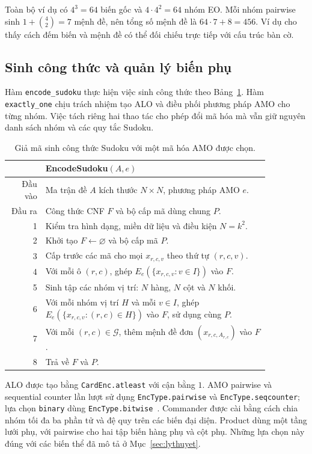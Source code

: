 \documentclass[a4paper,fleqn]{cas-sc}
\begin{document}
Toàn bộ ví dụ có $4^3=64$ biến gốc và $4\cdot4^2=64$ nhóm EO.
Mỗi nhóm pairwise sinh $1+\binom{4}{2}=7$ mệnh đề, nên tổng số mệnh đề
là $64\cdot7+8=456$. Ví dụ cho thấy cách đếm biến và mệnh đề có thể
đối chiếu trực tiếp với cấu trúc bàn cờ.

\subsection{Sinh công thức và quản lý biến phụ}

Hàm \texttt{encode\_sudoku} thực hiện việc sinh công thức theo
Bảng~\ref{tab:method-encoding-algorithm}. Hàm \texttt{exactly\_one}
chịu trách nhiệm tạo ALO và điều phối phương pháp AMO cho từng nhóm.
Việc tách riêng hai thao tác cho phép đổi mã hóa mà vẫn giữ nguyên
danh sách nhóm và các quy tắc Sudoku.

\begin{table}[pos=htbp]
 \centering
 \caption{Giả mã sinh công thức Sudoku với một mã hóa AMO được chọn.}
 \label{tab:method-encoding-algorithm}
 \begin{tabular}{rp{0.86\linewidth}}
  \toprule
  & \textbf{EncodeSudoku}$(A,e)$ \\
  \midrule
  Đầu vào & Ma trận đề $A$ kích thước $N\times N$, phương pháp AMO $e$. \\
  Đầu ra & Công thức CNF $F$ và bộ cấp mã dùng chung $P$. \\
  1 & Kiểm tra hình dạng, miền dữ liệu và điều kiện $N=k^2$. \\
  2 & Khởi tạo $F\leftarrow\varnothing$ và bộ cấp mã $P$. \\
  3 & Cấp trước các mã cho mọi $x_{r,c,v}$ theo thứ tự $(r,c,v)$. \\
  4 & Với mỗi ô $(r,c)$, ghép $E_e(\{x_{r,c,v}:v\in I\})$ vào $F$. \\
  5 & Sinh tập các nhóm vị trí: $N$ hàng, $N$ cột và $N$ khối. \\
  6 & Với mỗi nhóm vị trí $H$ và mỗi $v\in I$, ghép
      $E_e(\{x_{r,c,v}:(r,c)\in H\})$ vào $F$, sử dụng cùng $P$. \\
  7 & Với mỗi $(r,c)\in\mathcal{G}$, thêm mệnh đề đơn
      $(x_{r,c,A_{r,c}})$ vào $F$. \\
  8 & Trả về $F$ và $P$. \\
  \bottomrule
 \end{tabular}
\end{table}

ALO được tạo bằng \texttt{CardEnc.atleast} với cận bằng $1$.
AMO pairwise và sequential counter lần lượt sử dụng
\texttt{EncType.pairwise} và \texttt{EncType.seqcounter}; lựa chọn
\texttt{binary} dùng \texttt{EncType.bitwise}~.
Commander được cài bằng cách chia nhóm tối đa ba phần tử và đệ quy trên
các biến đại diện. Product dùng một tầng lưới phụ, với pairwise cho
hai tập biến hàng phụ và cột phụ. Những lựa chọn này đúng với các biến
thể đã mô tả ở Mục~\ref{sec:lythuyet}.
\end{document}
